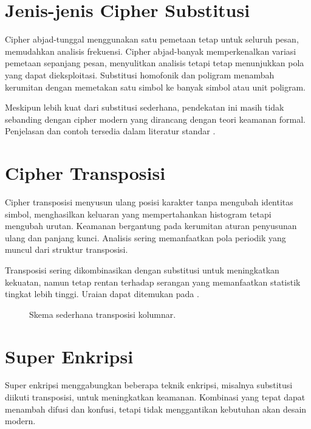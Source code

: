 \documentclass[../main.tex]{subfiles}
\begin{document}
\section{Jenis-jenis Cipher Substitusi}
Cipher abjad-tunggal menggunakan satu pemetaan tetap untuk seluruh pesan, memudahkan analisis frekuensi. Cipher abjad-banyak memperkenalkan variasi pemetaan sepanjang pesan, menyulitkan analisis tetapi tetap menunjukkan pola yang dapat dieksploitasi. Substitusi homofonik dan poligram menambah kerumitan dengan memetakan satu simbol ke banyak simbol atau unit poligram.

Meskipun lebih kuat dari substitusi sederhana, pendekatan ini masih tidak sebanding dengan cipher modern yang dirancang dengan teori keamanan formal. Penjelasan dan contoh tersedia dalam literatur standar \parencite{menezes1996handbook}.

\section{Cipher Transposisi}
Cipher transposisi menyusun ulang posisi karakter tanpa mengubah identitas simbol, menghasilkan keluaran yang mempertahankan histogram tetapi mengubah urutan. Keamanan bergantung pada kerumitan aturan penyusunan ulang dan panjang kunci. Analisis sering memanfaatkan pola periodik yang muncul dari struktur transposisi.

Transposisi sering dikombinasikan dengan substitusi untuk meningkatkan kekuatan, namun tetap rentan terhadap serangan yang memanfaatkan statistik tingkat lebih tinggi. Uraian dapat ditemukan pada \textcite{menezes1996handbook}.

\begin{figure}[h]
\centering
{}
\caption{Skema sederhana transposisi kolumnar.}
\label{fig:transposisi}
\end{figure}

\section{Super Enkripsi}
Super enkripsi menggabungkan beberapa teknik enkripsi, misalnya substitusi diikuti transposisi, untuk meningkatkan keamanan. Kombinasi yang tepat dapat menambah difusi dan konfusi, tetapi tidak menggantikan kebutuhan akan desain modern.
\end{document}
